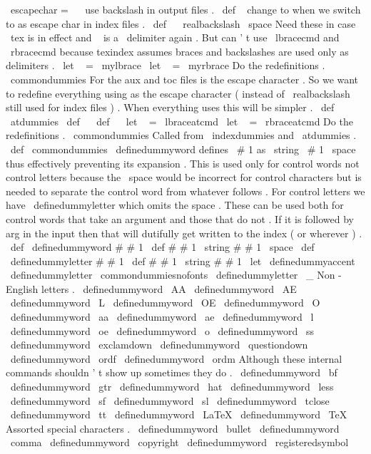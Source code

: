 {
%
\
escapechar
=
\
\
%
use
backslash
in
output
files
.
\
def
\
{
}
%
change
to
when
we
switch
to
as
escape
char
in
index
files
.
\
def
\
{
\
realbackslash
\
space
}
%
%
Need
these
in
case
\
tex
is
in
effect
and
\
{
is
a
\
delimiter
again
.
%
But
can
'
t
use
\
lbracecmd
and
\
rbracecmd
because
texindex
assumes
%
braces
and
backslashes
are
used
only
as
delimiters
.
\
let
\
{
=
\
mylbrace
\
let
\
}
=
\
myrbrace
%
%
Do
the
redefinitions
.
\
commondummies
}
%
For
the
aux
and
toc
files
is
the
escape
character
.
So
we
want
to
%
redefine
everything
using
as
the
escape
character
(
instead
of
%
\
realbackslash
still
used
for
index
files
)
.
When
everything
uses
%
this
will
be
simpler
.
%
\
def
\
atdummies
{
%
\
def
\
{
}
%
\
def
\
{
}
%
\
let
\
{
=
\
lbraceatcmd
\
let
\
}
=
\
rbraceatcmd
%
%
Do
the
redefinitions
.
\
commondummies
}
%
Called
from
\
indexdummies
and
\
atdummies
.
%
\
def
\
commondummies
{
%
%
%
\
definedummyword
defines
\
#
1
as
\
string
\
#
1
\
space
thus
effectively
%
preventing
its
expansion
.
This
is
used
only
for
control
%
words
%
not
control
letters
because
the
\
space
would
be
incorrect
for
%
control
characters
but
is
needed
to
separate
the
control
word
%
from
whatever
follows
.
%
%
For
control
letters
we
have
\
definedummyletter
which
omits
the
%
space
.
%
%
These
can
be
used
both
for
control
words
that
take
an
argument
and
%
those
that
do
not
.
If
it
is
followed
by
{
arg
}
in
the
input
then
%
that
will
dutifully
get
written
to
the
index
(
or
wherever
)
.
%
\
def
\
definedummyword
#
#
1
{
\
def
#
#
1
{
\
string
#
#
1
\
space
}
}
%
\
def
\
definedummyletter
#
#
1
{
\
def
#
#
1
{
\
string
#
#
1
}
}
%
\
let
\
definedummyaccent
\
definedummyletter
%
\
commondummiesnofonts
%
\
definedummyletter
\
_
%
%
%
Non
-
English
letters
.
\
definedummyword
\
AA
\
definedummyword
\
AE
\
definedummyword
\
L
\
definedummyword
\
OE
\
definedummyword
\
O
\
definedummyword
\
aa
\
definedummyword
\
ae
\
definedummyword
\
l
\
definedummyword
\
oe
\
definedummyword
\
o
\
definedummyword
\
ss
\
definedummyword
\
exclamdown
\
definedummyword
\
questiondown
\
definedummyword
\
ordf
\
definedummyword
\
ordm
%
%
Although
these
internal
commands
shouldn
'
t
show
up
sometimes
they
do
.
\
definedummyword
\
bf
\
definedummyword
\
gtr
\
definedummyword
\
hat
\
definedummyword
\
less
\
definedummyword
\
sf
\
definedummyword
\
sl
\
definedummyword
\
tclose
\
definedummyword
\
tt
%
\
definedummyword
\
LaTeX
\
definedummyword
\
TeX
%
%
Assorted
special
characters
.
\
definedummyword
\
bullet
\
definedummyword
\
comma
\
definedummyword
\
copyright
\
definedummyword
\
registeredsymbol
}}
